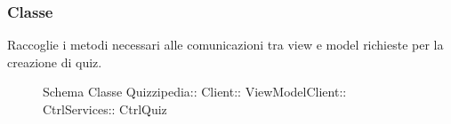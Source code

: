 \subsubsection{Classe }
Raccoglie i metodi necessari alle comunicazioni tra view e model richieste per la creazione di quiz.
\begin{figure}[H]
\centering
\noindent{}
\caption[Schema Classe CtrlQuiz]{Schema Classe Quizzipedia:: Client:: ViewModelClient:: CtrlServices:: CtrlQuiz}
\end{figure}
